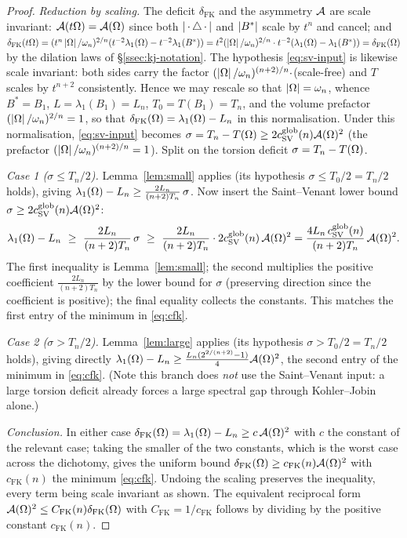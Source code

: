 \begin{proof}
\emph{Reduction by scaling.} The deficit $\delta_{\mathrm{FK}}$ and the
asymmetry $\mathcal A$ are scale invariant: $\mathcal A(t\Omega)=\mathcal A(\Omega)$ since both
$\left|\,\cdot\,\triangle\,\cdot\,\right|$ and $\left|B^*\right|$ scale by $t^n$ and cancel;
and $\delta_{\mathrm{FK}}(t\Omega)=(t^n\left|\Omega\right|/\omega_n)^{2/n}
(t^{-2}\lambda_1(\Omega)-t^{-2}\lambda_1(B^*))
=t^2(\left|\Omega\right|/\omega_n)^{2/n}\cdot t^{-2}(\lambda_1(\Omega)-\lambda_1(B^*))
=\delta_{\mathrm{FK}}(\Omega)$ by the dilation laws of \S\ref{ssec:kj-notation}.
The hypothesis \eqref{eq:sv-input} is likewise scale invariant: both sides
carry the factor $(\left|\Omega\right|/\omega_n)^{(n+2)/n}\cdot$(scale-free) and $T$
scales by $t^{n+2}$ consistently. Hence we may rescale so that
$\left|\Omega\right|=\omega_n$, whence $B^*=B_1$, $L=\lambda_1(B_1)=L_n$,
$T_0=T(B_1)=T_n$, and the volume prefactor $(\left|\Omega\right|/\omega_n)^{2/n}=1$, so
that $\delta_{\mathrm{FK}}(\Omega)=\lambda_1(\Omega)-L_n$ in this normalisation.
Under this normalisation, \eqref{eq:sv-input} becomes
$\sigma=T_n-T(\Omega)\ge2c_{\mathrm{SV}}^{\mathrm{glob}}(n)\mathcal A(\Omega)^2$ (the
prefactor $(\left|\Omega\right|/\omega_n)^{(n+2)/n}=1$). Split on the torsion deficit
$\sigma=T_n-T(\Omega)$.

\emph{Case 1 ($\sigma\le T_n/2$).} Lemma~\ref{lem:small} applies (its
hypothesis $\sigma\le T_0/2=T_n/2$ holds), giving $\lambda_1(\Omega)-L_n\ge
\tfrac{2L_n}{(n+2)T_n}\,\sigma$. Now insert the Saint--Venant lower bound
$\sigma\ge2c_{\mathrm{SV}}^{\mathrm{glob}}(n)\mathcal A(\Omega)^2$:
\[
  \lambda_1(\Omega)-L_n
  \ \ge\ \frac{2L_n}{(n+2)T_n}\,\sigma
  \ \ge\ \frac{2L_n}{(n+2)T_n}\cdot 2c_{\mathrm{SV}}^{\mathrm{glob}}(n)
     \,\mathcal A(\Omega)^2
  =\frac{4L_n\,c_{\mathrm{SV}}^{\mathrm{glob}}(n)}{(n+2)T_n}\,\mathcal A(\Omega)^2 .
\]
The first inequality is Lemma~\ref{lem:small}; the second multiplies the
positive coefficient $\tfrac{2L_n}{(n+2)T_n}$ by the lower bound for
$\sigma$ (preserving direction since the coefficient is positive); the final
equality collects the constants. This matches the first entry of the minimum
in \eqref{eq:cfk}.

\emph{Case 2 ($\sigma>T_n/2$).} Lemma~\ref{lem:large} applies (its
hypothesis $\sigma>T_0/2=T_n/2$ holds), giving directly
$\lambda_1(\Omega)-L_n\ge\frac{L_n(2^{2/(n+2)}-1)}{4}\mathcal A(\Omega)^2$, the second
entry of the minimum in \eqref{eq:cfk}. (Note this branch does \emph{not}
use the Saint--Venant input: a large torsion deficit already forces a large
spectral gap through Kohler--Jobin alone.)

\emph{Conclusion.} In either case
$\delta_{\mathrm{FK}}(\Omega)=\lambda_1(\Omega)-L_n\ge c\,\mathcal A(\Omega)^2$ with $c$ the
constant of the relevant case; taking the smaller of the two constants,
which is the worst case across the dichotomy, gives the uniform bound
$\delta_{\mathrm{FK}}(\Omega)\ge c_{\mathrm{FK}}(n)\mathcal A(\Omega)^2$ with
$c_{\mathrm{FK}}(n)$ the minimum \eqref{eq:cfk}. Undoing the scaling
preserves the inequality, every term being scale invariant as shown. The
equivalent reciprocal form $\mathcal A(\Omega)^2\le C_{\mathrm{FK}}(n)
\delta_{\mathrm{FK}}(\Omega)$ with $C_{\mathrm{FK}}=1/c_{\mathrm{FK}}$ follows by
dividing by the positive constant $c_{\mathrm{FK}}(n)$.
\end{proof}

